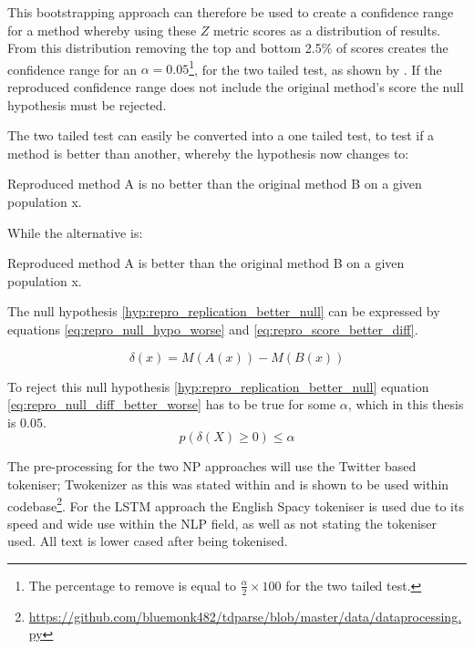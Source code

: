 This bootstrapping approach can therefore be used to create a confidence range for a method whereby using these $Z$ metric scores as a distribution of results. From this distribution removing the top and bottom 2.5\% of scores creates the confidence range for an $\alpha=0.05$\footnote{The percentage to remove is equal to $\frac{\alpha}{2} \times 100$ for the two tailed test.}, for the two tailed test, as shown by \citet{koehn-2004-statistical}. If the reproduced confidence range does not include the original method's score the null hypothesis must be rejected. 

The two tailed test can easily be converted into a one tailed test, to test if a method is better than another, whereby the hypothesis now changes to:
\begin{hyp}
Reproduced method A is no better than the original method B on a given population x. 
\label{hyp:repro_replication_better_null}
\end{hyp}
While the alternative is:
\begin{hyp}
Reproduced method A is better than the original method B on a given population x. 
\label{hyp:repro_replication_better_alt}
\end{hyp}

The null hypothesis \ref{hyp:repro_replication_better_null} can be expressed by equations \ref{eq:repro_null_hypo_worse} and \ref{eq:repro_score_better_diff}.  

\begin{equation}
 \delta(x) = M(A(x)) - M(B(x))
\label{eq:repro_score_better_diff}
\end{equation}

To reject this null hypothesis \ref{hyp:repro_replication_better_null} equation \ref{eq:repro_null_diff_better_worse} has to be true for some $\alpha$, which in this thesis is $0.05$. 
\begin{equation}
    p(\delta(X) \geq 0) \le \alpha
\label{eq:repro_null_diff_better_worse}
\end{equation}

The pre-processing for the two NP approaches will use the Twitter based tokeniser; Twokenizer \citep{gimpel-etal-2011-part} as this was stated within \citet{vo2015target} and is shown to be used within \citet{wang-etal-2017-tdparse} codebase\footnote{\url{https://github.com/bluemonk482/tdparse/blob/master/data/dataprocessing.py}}. For the LSTM approach \citep{tang-etal-2016-effective} the English Spacy tokeniser is used due to its speed and wide use within the NLP field, as well as \citet{tang-etal-2016-effective} not stating the tokeniser used. All text is lower cased after being tokenised.

